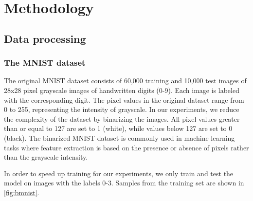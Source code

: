 \section{Methodology}\label{sec:Method}

\subsection{Data processing}
\subsubsection{The MNIST dataset}


The original MNIST dataset consists of 60,000 training and 10,000 test images of 28x28 pixel grayscale images of handwritten digits (0-9). Each image is labeled with the corresponding digit. The pixel values in the original dataset range from 0 to 255, representing the intensity of grayscale. In our experiments, we reduce the complexity of the dataset by binarizing the images. All pixel values greater than or equal to 127 are set to 1 (white), while values below 127 are set to 0 (black). The binarized MNIST dataset is commonly used in machine learning tasks where feature extraction is based on the presence or absence of pixels rather than the grayscale intensity.

In order to speed up training for our experiments, we only train and test the model on images with the labels 0-3. Samples from the training set are shown in \autoref{fig:bmnist}.


